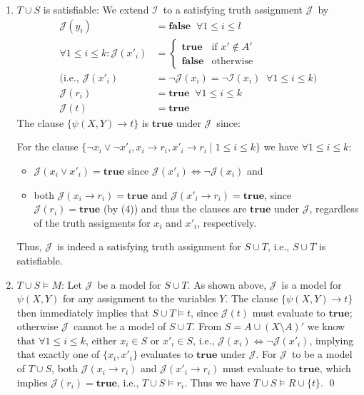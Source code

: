\documentclass [11pt]{article}
\newcommand{\ra}{\rightarrow}
\newcommand{\True}{\mathbf{true}}
\newcommand{\False}{\mathbf{false}}
\newcommand{\mI}{\ensuremath{\mathcal{I}}}
\newcommand{\mJ}{\ensuremath{\mathcal{J}}}
\begin{document}
\begin{enumerate}
 \item $T \cup S$ is satisfiable: We extend \mI\ to a satisfying truth assignment \mJ\ by
 \begin{align}
  \mJ(y_i) &= \False\;\;\forall 1 \leq i \leq l \\
  \forall 1 \leq i \leq k: \mJ(x'_i) &= 
  \begin{cases}
  \True &\text{if } x' \not \in A' \\
  \False &\text{otherwise}
  \end{cases} \\
  (\text{i.e., } \mJ(x'_i) &= \neg \mJ(x_i) = \neg \mI(x_i) \;\; \forall 1 \leq i \leq k)\\
  \mJ(r_i) &= \True \;\;\forall 1 \leq i \leq k \\
  \mJ(t) &= \True
 \end{align}
  The clause $\{ \psi(X,Y) \rightarrow t\}$ is $\True$ under \mJ\ since:
 For the clause $\{\neg x_i \vee \neg x'_i, x_i \ra r_i, x'_i \ra r_i \mid 1 \leq i \leq k\}$ we have $\forall 1 \leq i \leq k:$
 \begin{itemize}
  \item $\mJ(x_i \lor x'_i) = \True$ since $\mJ(x'_i) \iff \neg \mJ(x_i)$ and 
  \item both $\mJ(x_i \ra r_i) = \True$ and $\mJ(x'_i \ra r_i) = \True$, since $\mJ(r_i) = \True$ (by (4)) and thus the clauses are $\True$ under \mJ, regardless of the truth assigments for $x_i$ and $x'_i$, respectively.
 \end{itemize}
 Thus, \mJ\ is indeed a satisfying truth assignment for  $S\cup T$, i.e.,  $S\cup T$ is satisfiable.
 \item $T \cup S \models M$: 
 Let \mJ\ be a model for $S\cup T$. 
 As shown above, \mJ\ is a model for $\psi(X,Y)$ for any assignment to the variables $Y$. 
 The clause $\{ \psi(X,Y) \rightarrow t\}$ then immediately implies that $S\cup T \models t$, since $\mJ(t)$ must evaluate to $\True$; otherwise \mJ\ cannot be a model of $S\cup T$.
 From $S = A \cup (X\setminus A)'$ we know that $\forall 1 \leq i \leq k$, either $x_i \in S$ or $x'_i \in S$, i.e., $\mJ(x_i) \iff \neg \mJ(x'_i)$, implying that exactly one of $\{x_i, x'_i\}$ evaluates to $\True$ under \mJ.
 For \mJ\ to be a model of $T\cup S$, both $\mJ(x_i \ra r_i)$ and $\mJ(x'_i \ra r_i)$ must evaluate to $\True$, which implies $\mJ(r_i) = \True$, i.e., $T\cup S \models r_i$.
 Thus we have $T\cup S \models R \cup \{t\}$. \qed
\end{enumerate}
\end{document}
